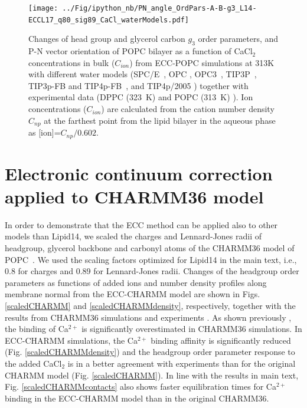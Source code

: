 \documentclass[journal=jpcbfk]{achemso}
\begin{document}
\begin{figure}[!hp]
  \centering
  \texttt{[image: ../Fig/ipython\_nb/PN\_angle\_OrdPars-A-B-g3\_L14-ECCL17\_q80\_sig89\_CaCl\_waterModels.pdf]}
  \caption{\label{fig:ordPars_waterModels}
    Changes of head group and glycerol carbon $g_3$ order parameters, and P-N vector orientation of POPC bilayer
    as a function of CaCl$_2$ concentrations in bulk ($C_{ion}$) from ECC-POPC simulations at 313K with different
    water models (SPC/E~\cite{Berendsen1987}, OPC \cite{Izadi14}, OPC3~\cite{Izadi16}, TIP3P~\cite{jorgensen83}, TIP3p-FB and TIP4p-FB~\cite{Wang2014}, and TIP4p/2005 \cite{Abascal2005})
    together with experimental data (DPPC (323~K) \cite{akutsu81} and POPC (313~K) \cite{altenbach84}). 
    Ion concentrations ($C_{ion}$) are calculated from the cation number density $C_{np}$
    at the farthest point from the lipid bilayer in the aqueous phase as [ion]=$C_{np}/0.602$.
  }
\end{figure}

\newpage
\section{Electronic continuum correction applied to CHARMM36 model}
In order to demonstrate that the ECC method can be applied also to other models than Lipid14,
we scaled the charges and Lennard-Jones radii of headgroup, glycerol backbone and
carbonyl atoms of the CHARMM36 model of POPC~\cite{klauda10}. We used the
scaling factors optimized for Lipid14 in the main text, i.e., 0.8 for charges and 0.89 for Lennard-Jones
radii. Changes of the headgroup order parameters as functions of added ions
and number density profiles along membrane normal from the ECC-CHARMM model are shown 
in Figs. \ref{scaledCHARMM} and \ref{scaledCHARMMdensity}, respectively,
together with the results from CHARMM36 simulations \cite{catte16,charmmPOPC450mMCaClfiles}
and experiments \cite{akutsu81,altenbach84}. As shown previously \cite{catte16},
the binding of Ca$^{2+}$ is significantly overestimated in CHARMM36 simulations.
In ECC-CHARMM simulations, the Ca$^{2+}$ binding affinity 
is significantly reduced (Fig. \ref{scaledCHARMMdensity}) and the headgroup order parameter response to the added CaCl$_2$
is in a better agreement with experiments than for the original CHARMM model (Fig. \ref{scaledCHARMM}).
In line with the results in main text,
Fig. \ref{scaledCHARMMcontacts} also shows faster equilibration times
for Ca$^{2+}$ binding in the ECC-CHARMM model than in the original CHARMM36.
\end{document}
